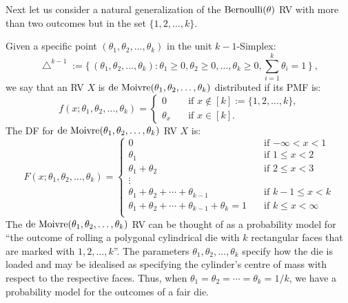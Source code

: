 Next let us consider a natural generalization of the $\mbox{{\rm Bernoulli}}(\theta)$ RV with more than two outcomes but in the set $\{1,2,\ldots,k\}$.
\begin{model}\label{M:demoivre}
Given a specific point $(\theta_1,\theta_2,\ldots,\theta_k)$ in the unit $k-1$-Simplex:
\[
\bigtriangleup^{k-1} :=  \{ \,  ( \theta_1,\theta_2,\ldots,\theta_k) :  \theta_1 \geq 0, \theta_2 \geq 0, \ldots, \theta_k \geq 0, \sum_{i=1}^k \theta_i = 1 \, \}  \ ,
\]
we say that an RV $X$ is $\mbox{{\rm de~Moivre}}(\theta_1,\theta_2,\ldots,\theta_k)$ distributed if its PMF is:
\[
f(x;\theta_1,\theta_2,\ldots,\theta_k) =
\begin{cases}
0 & \quad \text{if $x \notin [k] := \{1,2,\ldots,k\}$,} \\
\theta_x & \quad \text{if $x \in [k]$}   .
\end{cases}
\]
The DF for $\mbox{{\rm de~Moivre}}(\theta_1,\theta_2,\ldots,\theta_k)$ RV $X$ is:
\begin{equation}\label{E:deMoivreDF}
F(x;\theta_1,\theta_2,\ldots,\theta_k) =
\begin{cases}
0 & \quad  \text{if $-\infty < x < 1$}\\
\theta_1 & \quad \text{if $1 \leq x < 2$} \\
\theta_1+\theta_2 & \quad \text{if $2 \leq x < 3$} \\
\vdots & \\
\theta_1+\theta_2+\cdots+\theta_{k-1} & \quad \text{if $k-1 \leq x < k$} \\
\theta_1+\theta_2+\cdots+\theta_{k-1}+\theta_k=1 & \quad \text{if $k \leq x < \infty$} \\
\end{cases}
\end{equation}
The $\mbox{{\rm de~Moivre}}(\theta_1,\theta_2,\ldots,\theta_k)$ RV can be thought of as a probability model for ``the outcome  of rolling a polygonal cylindrical die with $k$ rectangular faces that are marked with $1, 2, \ldots, k$''.  The parameters $\theta_1,\theta_2,\ldots,\theta_k$ specify how the die is loaded and may be idealised as specifying the cylinder's centre of mass with respect to the respective faces.  Thus, when $\theta_1=\theta_2=\cdots=\theta_k=1/k$, we have a probability model for the outcomes of a fair die.
\end{model}

